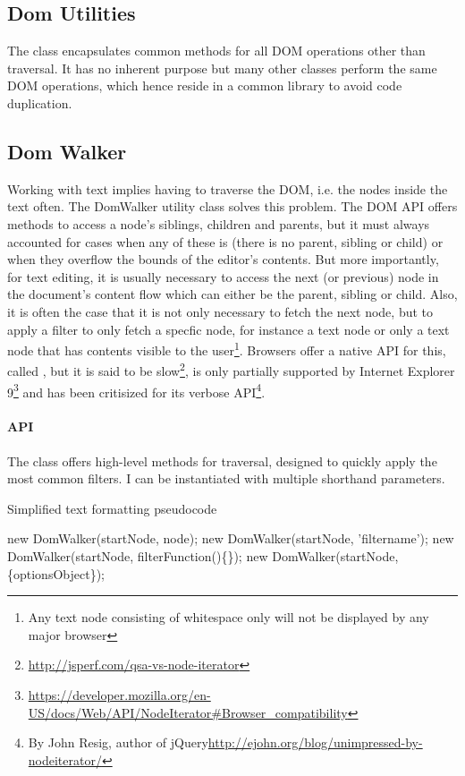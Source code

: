 \subsection{Dom Utilities}

The  class encapsulates common methods for all DOM operations other than traversal. It has no inherent purpose but many other classes perform the same DOM operations, which hence reside in a common library to avoid code duplication.

\subsection{Dom Walker}

Working with text implies having to traverse the DOM, i.e. the nodes inside the text often. The {DomWalker} utility class solves this problem. The DOM API offers methods to access a node's siblings, children and parents, but it must always accounted for cases when any of these is  (there is no parent, sibling or child) or when they overflow the bounds of the editor's contents. But more importantly, for text editing, it is usually necessary to access the next (or previous) node in the document's content flow which can either be the parent, sibling or child. Also, it is often the case that it is not only necessary to fetch the next node, but to apply a filter to only fetch a specfic node, for instance a text node or only a text node that has contents visible to the user\footnote{Any text node consisting of whitespace only will not be displayed by any major browser}. Browsers offer a native API for this, called , but it is said to be slow\footnote{\url{http://jsperf.com/qsa-vs-node-iterator}}, is only partially supported by Internet Explorer 9\footnote{\url{https://developer.mozilla.org/en-US/docs/Web/API/NodeIterator\#Browser_compatibility}} and has been critisized for its verbose API\footnote{By John Resig, author of jQuery\url{http://ejohn.org/blog/unimpressed-by-nodeiterator/}}.

\paragraph{API}

The  class offers high-level methods for traversal, designed to quickly apply the most common filters. I can be instantiated with multiple shorthand parameters.

\begin{algorithm}
\caption{Simplified text formatting pseudocode}
\label{alg:format_pseudocode}
\begin{algorithmic}[1]
\State new DomWalker(startNode, node);
\State new DomWalker(startNode, 'filtername');
\State new DomWalker(startNode, filterFunction()\{\});
\State new DomWalker(startNode,\{optionsObject\});
\end{algorithmic}
\end{algorithm}

